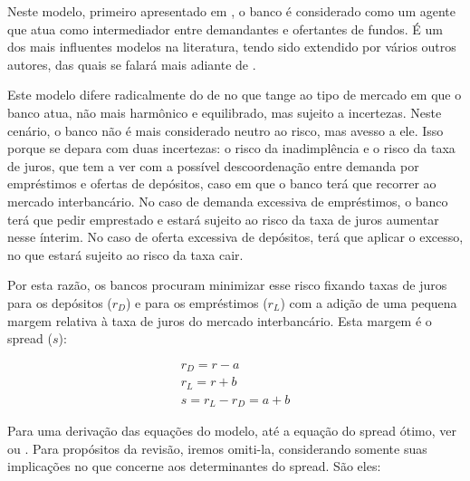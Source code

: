 \documentclass[a4paper, 12pt, openany, oneside, brazil]{abntex2}
\begin{document}
    Neste modelo, primeiro apresentado em , o banco é
    considerado como um agente que atua como intermediador entre demandantes e
    ofertantes de fundos. É um dos mais influentes modelos na literatura, tendo
    sido extendido por vários outros autores, das quais se falará mais adiante
    de .

    Este modelo difere radicalmente do de  no que tange ao
    tipo de mercado em que o banco atua, não mais harmônico e equilibrado, mas
    sujeito a incertezas. Neste cenário, o banco não é mais considerado neutro
    ao risco, mas avesso a ele. Isso porque se depara com duas incertezas: o
    risco da inadimplência e o risco da taxa de juros, que tem a ver com a
    possível descoordenação entre demanda por empréstimos e ofertas de
    depósitos, caso em que o banco terá que recorrer ao mercado interbancário.
    No caso de demanda excessiva de empréstimos, o banco terá que pedir
    emprestado e estará sujeito ao risco da taxa de juros aumentar nesse
    ínterim. No caso de oferta excessiva de depósitos, terá que aplicar o
    excesso, no que estará sujeito ao risco da taxa cair.

    Por esta razão, os bancos procuram minimizar esse risco fixando taxas de
    juros para os depósitos ($r_D$) e para os empréstimos ($r_L$) com a adição
    de uma pequena margem relativa à taxa de juros do mercado interbancário.
    Esta margem é o spread ($s$):

	\begin{gather}
		r_D = r - a \\
		r_L = r + b \\
		s = r_L - r_D = a + b
	\end{gather}

    Para uma derivação das equações do modelo, até a equação do spread ótimo,
    ver  ou . Para
    propósitos da revisão, iremos omiti-la, considerando somente suas
    implicações no que concerne aos determinantes do spread. São eles:
\end{document}
